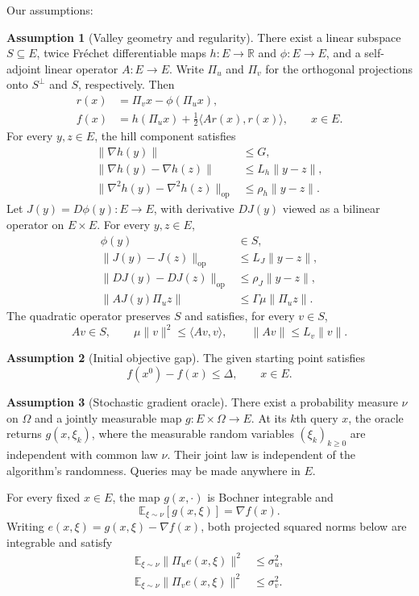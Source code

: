 \documentclass[10pt]{article}
\theoremstyle{definition}
\newtheorem{assumption}{Assumption}
\begin{document}
Our assumptions:
\begin{assumption}[Valley geometry and regularity]
There exist a linear subspace $S\subseteq E$, twice Fr\'echet differentiable maps $h:E\to\mathbb{R}$ and $\phi:E\to E$, and a self-adjoint linear operator $A:E\to E$. Write $\Pi_u$ and $\Pi_v$ for the orthogonal projections onto $S^\perp$ and $S$, respectively. Then
\[
\begin{aligned}
r(x)&=\Pi_v x-\phi(\Pi_u x),\\
f(x)&=h(\Pi_u x)+\frac12\langle A r(x),r(x)\rangle,
\qquad x\in E.
\end{aligned}
\]
For every $y,z\in E$, the hill component satisfies
\[
\begin{aligned}
\|\nabla h(y)\|&\leq G,\\
\|\nabla h(y)-\nabla h(z)\|&\leq L_h\|y-z\|,\\
\|\nabla^2h(y)-\nabla^2h(z)\|_{\mathrm{op}}
&\leq\rho_h\|y-z\|.
\end{aligned}
\]
Let $J(y)=D\phi(y):E\to E$, with derivative $DJ(y)$ viewed as a bilinear operator on $E\times E$. For every $y,z\in E$,
\[
\begin{aligned}
\phi(y)&\in S,\\
\|J(y)-J(z)\|_{\mathrm{op}}&\leq L_J\|y-z\|,\\
\|DJ(y)-DJ(z)\|_{\mathrm{op}}&\leq\rho_J\|y-z\|,\\
\|A J(y)\Pi_u z\|&\leq\Gamma\mu\|\Pi_u z\|.
\end{aligned}
\]
The quadratic operator preserves $S$ and satisfies, for every $v\in S$,
\[
A v\in S,\qquad
\mu\|v\|^2\leq\langle A v,v\rangle,\qquad
\|A v\|\leq L_v\|v\|.
\]
\end{assumption}

\begin{assumption}[Initial objective gap]
The given starting point satisfies
\[
f(x^0)-f(x)\leq\Delta,\qquad x\in E.
\]
\end{assumption}

\begin{assumption}[Stochastic gradient oracle]
There exist a probability measure $\nu$ on $\Omega$ and a jointly measurable map $g:E\times\Omega\to E$. At its $k$th query $x$, the oracle returns $g(x,\xi_k)$, where the measurable random variables $(\xi_k)_{k\geq0}$ are independent with common law $\nu$. Their joint law is independent of the algorithm's randomness. Queries may be made anywhere in $E$.

For every fixed $x\in E$, the map $g(x,\cdot)$ is Bochner integrable and
\[
\mathbb{E}_{\xi\sim\nu}[g(x,\xi)]=\nabla f(x).
\]
Writing $e(x,\xi)=g(x,\xi)-\nabla f(x)$, both projected squared norms below are integrable and satisfy
\[
\begin{aligned}
\mathbb{E}_{\xi\sim\nu}\|\Pi_u e(x,\xi)\|^2&\leq\sigma_u^2,\\
\mathbb{E}_{\xi\sim\nu}\|\Pi_v e(x,\xi)\|^2&\leq\sigma_v^2.
\end{aligned}
\]
\end{assumption}
\end{document}
